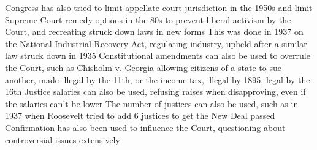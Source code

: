 \documentclass[11 pt, twoside]{article}
\newenvironment{outline*}
{
	\begin{outline}[enumerate]
	}
	{\end{outline}
}
\begin{document}
\begin{outline*}
\2 Congress has also tried to limit appellate court jurisdiction in the 1950s and limit Supreme Court remedy options in the 80s to prevent liberal activism by the Court, and recreating struck down laws in new forms
\2 This was done in 1937 on the National Industrial Recovery Act, regulating industry, upheld after a similar law struck down in 1935
\2 Constitutional amendments can also be used to overrule the Court, such as Chisholm v. Georgia allowing citizens of a state to sue another, made illegal by the 11th, or the income tax, illegal by 1895, legal by the 16th
\2 Justice salaries can also be used, refusing raises when disapproving, even if the salaries can’t be lower
\2 The number of justices can also be used, such as in 1937 when Roosevelt tried to add 6 justices to get the New Deal passed
\2 Confirmation has also been used to influence the Court, questioning about controversial issues extensively
\end{outline*}
\end{document}
